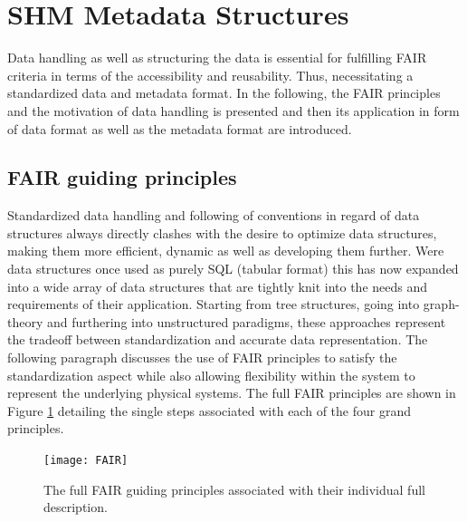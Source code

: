 \newpage


\section{SHM Metadata Structures}

Data handling as well as structuring the data is essential for fulfilling FAIR criteria in terms of the accessibility and reusability. Thus, necessitating a standardized data and metadata format. In the following, the FAIR principles and the motivation of data handling is presented and then its application in form of data format as well as the metadata format are introduced.


\subsection{FAIR guiding principles}

Standardized data handling and following of conventions in regard of data structures always directly clashes with the desire to optimize data structures, making them more efficient, dynamic as well as developing them further. Were data structures once used as purely SQL (tabular format) this has now expanded into a wide array of data structures that are tightly knit into the needs and requirements of their application. Starting from tree structures, going into graph-theory and furthering into unstructured paradigms, these approaches represent the tradeoff between standardization and accurate data representation. The following paragraph discusses the use of FAIR principles to satisfy the standardization aspect while also allowing flexibility within the system to represent the underlying physical systems. The full FAIR principles are shown in Figure \ref{fig:FAIR} detailing the single steps associated with each of the four grand principles.\cite{wilkinson_fair_2016}
\begin{figure}[h]
    \centering
    \texttt{[image: FAIR]}
    \caption[The FAIR principles \cite{wilkinson_fair_2016}]{The full FAIR guiding principles associated with their individual full description. \cite{wilkinson_fair_2016}}
    \label{fig:FAIR}
\end{figure}

